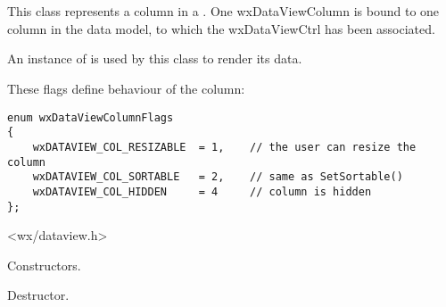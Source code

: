 
\section{}\label{wxdataviewcolumn}


This class represents a column in a .
One wxDataViewColumn is bound to one column in the data model,
to which the wxDataViewCtrl has been associated. 

An instance of  is used by
this class to render its data.


These flags define behaviour of the column:

{\small
\begin{verbatim}
enum wxDataViewColumnFlags
{
    wxDATAVIEW_COL_RESIZABLE  = 1,    // the user can resize the column
    wxDATAVIEW_COL_SORTABLE   = 2,    // same as SetSortable()
    wxDATAVIEW_COL_HIDDEN     = 4     // column is hidden
};
\end{verbatim}
}




<wx/dataview.h>





\label{wxdataviewcolumnwxdataviewcolumn}




Constructors.


\label{wxdataviewcolumndtor}


Destructor.

